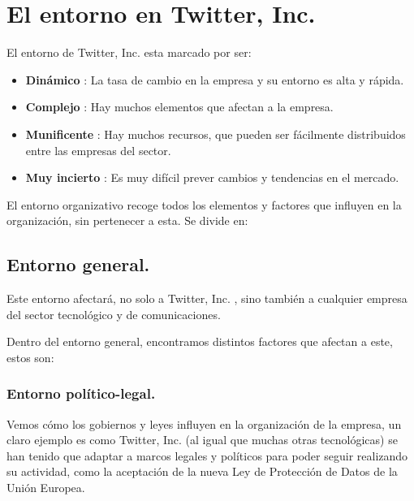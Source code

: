 \newpage


\section{El entorno en Twitter, Inc.}

El entorno de Twitter, Inc. esta marcado por ser:

\begin{itemize}

\item \textbf{Dinámico} : La tasa de cambio en la empresa y su entorno es alta y rápida.

\item \textbf{Complejo} : Hay muchos elementos que afectan a la empresa.

\item \textbf{Munificente} : Hay muchos recursos, que pueden ser fácilmente distribuidos entre las empresas del sector.

\item \textbf{Muy incierto} : Es muy difícil prever cambios y tendencias en el mercado.

\end{itemize}

El entorno organizativo recoge todos los elementos y factores que influyen en la organización, sin pertenecer a esta. Se divide en:

\subsection{Entorno general.}

Este entorno afectará, no solo a Twitter, Inc. , sino también a cualquier empresa del sector tecnológico y de comunicaciones.

Dentro del entorno general, encontramos distintos factores que afectan a este, estos son:

\subsubsection{Entorno político-legal.}

Vemos cómo los gobiernos y leyes influyen en la organización de la empresa, un claro ejemplo es como Twitter, Inc. (al igual que muchas otras tecnológicas) se han tenido que adaptar a marcos legales y políticos para poder seguir realizando su actividad, como la aceptación de la nueva Ley de Protección de Datos de la Unión Europea.

